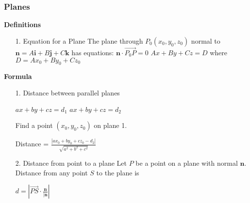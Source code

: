 \documentclass[10pt, twocolumn]{article}
\begin{document}
\subsubsection{Planes}
{\bf Definitions}
\begin{enumerate}
\item[1.]{Equation for a Plane}
\newline
The plane through $P_0(x_0,y_0,z_0)$ normal to $\mathbf{n} = A\mathbf{i}+B\mathbf{j}+C\mathbf{k}$ has equations:
\newline
$\mathbf{n} \cdot \vec{P_0P} = 0$
\newline
$Ax + By + Cz = D$
\newline
where $D = Ax_0 + By_0 + Cz_0$
\end{enumerate}
{\bf Formula}
\begin{enumerate}
\item[1.]{Distance between parallel planes}
\begin{center}
$ax+by+cz = d_1$ \hspace{20pt} $ax+by+cz = d_2$
\end{center}
Find a point $(x_0,y_0,z_0)$ on plane 1.
\begin{center}
Distance = $\frac{|ax_0+by_0+cz_0-d_2|}{\sqrt{a^2+b^2+c^2}}$
\end{center}
\item[2.]{Distance from point to a plane}
\newline
Let $P$ be a point on a plane with normal $\mathbf{n}$. \\
Distance from any point $S$ to the plane is
\begin{center}
$d = |\vec{PS} \cdot \frac{\mathbf{n}}{|\mathbf{n}}|$
\end{center}
\end{enumerate}
\end{document}
